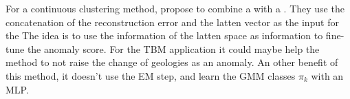 \documentclass[../description.tex]{subfiles}
\begin{document}
    For a continuous clustering method, \cite{BoZong.2018} propose to combine a  with a .
    They use the concatenation of the reconstruction error and the latten vector as the input for the 
    The idea is to use the information of the latten space as information to fine-tune the anomaly score.
    For the TBM application it could maybe help the method to not raise the change of geologies as an anomaly.
    An other benefit of this method, it doesn't use the EM step, and learn the GMM classes $\pi_k$ with an MLP.
\end{document}
